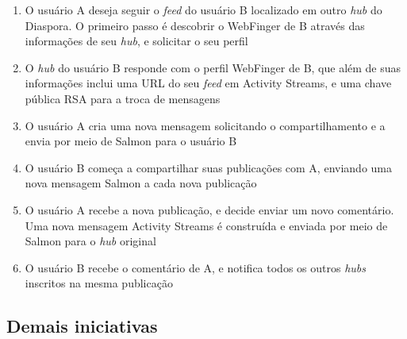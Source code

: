 \begin{enumerate}
  \item{O usuário A deseja seguir o \textit{feed} do usuário B localizado em outro
        \textit{hub} do Diaspora. O primeiro passo é descobrir o WebFinger de B
        através das informações de seu \textit{hub}, e solicitar o seu perfil}
  \item{O \textit{hub} do usuário B responde com o perfil WebFinger de B, que além
        de suas informações inclui uma URL do seu \textit{feed} em Activity Streams,
        e uma chave pública RSA para a troca de mensagens}
  \item{O usuário A cria uma nova mensagem solicitando o compartilhamento e a envia
        por meio de Salmon para o usuário B}
  \item{O usuário B começa a compartilhar suas publicações com A, enviando uma nova
        mensagem Salmon a cada nova publicação}
  \item{O usuário A recebe a nova publicação, e decide enviar um novo comentário.
        Uma nova mensagem Activity Streams é construída e enviada por meio de Salmon
        para o \textit{hub} original}
  \item{O usuário B recebe o comentário de A, e notifica todos os outros
        \textit{hubs} inscritos na mesma publicação}
\end{enumerate}

\subsection{Demais iniciativas}

